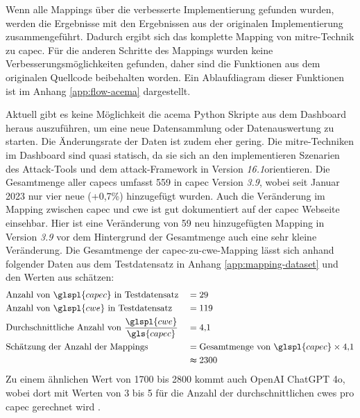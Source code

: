 Wenn alle Mappings über die verbesserte Implementierung gefunden wurden, werden die Ergebnisse mit den Ergebnissen aus der originalen Implementierung zusammengeführt. Dadurch ergibt sich das komplette Mapping von \gls{mitre}-Technik zu \gls{capec}. Für die anderen Schritte des Mappings wurden keine Verbesserungsmöglichkeiten gefunden, daher sind die Funktionen aus dem originalen Quellcode beibehalten worden. Ein Ablaufdiagram dieser Funktionen ist im Anhang \ref{app:flow-acema} dargestellt. 

Aktuell gibt es keine Möglichkeit die \gls{acema} Python Skripte aus dem Dashboard heraus auszuführen, um eine neue Datensammlung oder Datenauswertung zu starten. Die Änderungsrate der Daten ist zudem eher gering. Die \gls{mitre}-Techniken im Dashboard sind quasi statisch, da sie sich an den implementieren Szenarien des Attack-Tools und dem \gls{attack}-Framework in Version \textit{16.1}orientieren. Die Gesamtmenge aller \glspl{capec} umfasst 559 in \gls{capec} Version \textit{3.9}, wobei seit Januar 2023 nur vier neue (+0,7\%) hinzugefügt wurden. Auch die Veränderung im Mapping zwischen \gls{capec} und \gls{cwe} ist gut dokumentiert auf der \gls{capec} Webseite einsehbar. Hier ist eine Veränderung von 59 neu hinzugefügten Mapping in Version \textit{3.9} vor dem Hintergrund der Gesamtmenge auch eine sehr kleine Veränderung. Die Gesamtmenge der \gls{capec}-zu-\gls{cwe}-Mapping lässt sich anhand folgender Daten aus dem Testdatensatz in Anhang \ref{app:mapping-dataset} und den Werten aus \autocite{CAPECNewsEvents} schätzen:
\[
    \begin{alignedat}{2}
         & \text{Anzahl von } \glspl{capec} \text{ in Testdatensatz}            & \quad & = 29             \\
         & \text{Anzahl von } \glspl{cwe} \text{ in Testdatensatz}              & \quad & = 119            \\
         & \text{Durchschnittliche Anzahl von } \frac{\glspl{cwe}}{\gls{capec}} & \quad & =
        4{,}1                                                                                              \\
         & \text{Schätzung der Anzahl der Mappings}                             & \quad & =
        \text{Gesamtmenge von } \glspl{capec} \times 4{,}1                                                 \\
         &                                                                      &       & \thickapprox2300 \\
    \end{alignedat}
\]
Zu einem ähnlichen Wert von 1700 bis 2800 kommt auch OpenAI ChatGPT 4o, wobei dort mit Werten von 3 bis 5 für die Anzahl der durchschnittlichen \glspl{cwe} pro \gls{capec} gerechnet wird \autocite{openaichatgpt4oCAPECCWEMapping2024}.

